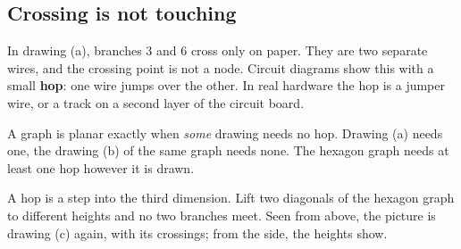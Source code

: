 \documentclass[11pt,a4paper]{article}
\newcommand{\hopr}{0.22cm}
\newcommand{\hopseg}[3]{%
  ($(#2)!\hopr!(#1)$) to[bend left=90, looseness=1.55] ($(#2)!\hopr!(#3)$)}
\newcommand{\squarehop}{%
  \coordinate (s1) at (0,2); \coordinate (s3) at (2,2);
  \coordinate (s4) at (2,0); \coordinate (s2) at (0,0);
  \coordinate (sx) at (1,1);
  \foreach \u/\v/\k/\lp in {s1/s2/1/left, s1/s3/2/above, s2/s4/4/below, s3/s4/5/right}
    \draw[black!75, thick] (\u) -- (\v) node[midway, \lp, blab] {\k};
  \draw[black!75, thick] (s3) -- (s2) node[pos=0.25, above left, blab, inner sep=1pt] {3};
  \draw[copper, very thick] (s4) -- \hopseg{s4}{sx}{s1} -- (s1);
  \node[blab, text=copper] at (1.62,0.62) {6};
  \foreach \k/\pos in {1/above left, 2/below left, 3/above right, 4/below right}
    {\fill[metured] (s\k) circle (2.2pt); \node[nlab, \pos=1pt] at (s\k) {\k};}}
\newcommand{\hexhop}{%
  \foreach \a/\n in {0/a,60/b,120/c,180/d,240/e,300/f} \coordinate (\n) at (\a:1.15);
  \draw[black!75, thick] (a) -- (b) -- (c) -- (d) -- (e) -- (f) -- cycle;
  \draw[black!75, thick] (a) -- (d);
  \draw[black!75, thick] (b) .. controls (3.1,2.2) and (0.6,-3.3) .. (e);
  \draw[copper, very thick] (c) -- \hopseg{c}{0,0}{f} -- (f);
  \foreach \n in {a,b,c,d,e,f} \fill[metured] (\n) circle (2.2pt);}
\newcommand{\hexthreeD}[1]{%
  \begin{scope}[#1]
    \fill[metulight] (-1.55,-1.55,0) -- (1.55,-1.55,0) -- (1.55,1.55,0) -- (-1.55,1.55,0) -- cycle;
    \draw[gray!45] (-1.55,-1.55,0) -- (1.55,-1.55,0) -- (1.55,1.55,0) -- (-1.55,1.55,0) -- cycle;
    \foreach \a in {0,60,...,300}
      \draw[black!75, thick] ({1.15*cos(\a)},{1.15*sin(\a)},0) -- ({1.15*cos(\a+60)},{1.15*sin(\a+60)},0);
    \draw[black!75, thick] ({1.15*cos(120)},{1.15*sin(120)},0) -- ({-1.15*cos(120)},{-1.15*sin(120)},0);
    \foreach \a/\h in {0/0.6, 60/1.15}
      \draw[copper, very thick] plot[domain=0:1, samples=31, variable=\t]
        ({1.15*cos(\a)*(1-2*\t)},{1.15*sin(\a)*(1-2*\t)},{\h*sin(180*\t)});
    \foreach \a in {0,60,...,300} \fill[metured] ({1.15*cos(\a)},{1.15*sin(\a)},0) circle (2.2pt);
  \end{scope}}
\begin{document}
\subsection{Crossing is not touching}

In drawing (a), branches 3 and 6 cross only on paper. They are two separate wires, and the
crossing point is not a node. Circuit diagrams show this with a small \textbf{hop}: one wire
jumps over the other. In real hardware the hop is a jumper wire, or a track on a second
layer of the circuit board.

\begin{center}
\end{center}

A graph is planar exactly when \emph{some} drawing needs no hop. Drawing (a) needs one, the
drawing (b) of the same graph needs none. The hexagon graph needs at least one hop however
it is drawn.

A hop is a step into the third dimension. Lift two diagonals of the hexagon graph to
different heights and no two branches meet. Seen from above, the picture is drawing (c)
again, with its crossings; from the side, the heights show.

\begin{center}
\end{center}
\end{document}
